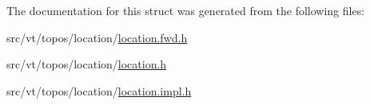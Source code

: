 The documentation for this struct was generated from the following files\+:\begin{DoxyCompactItemize}
\item 
src/vt/topos/location/\hyperlink{location_8fwd_8h}{location.\+fwd.\+h}\item 
src/vt/topos/location/\hyperlink{location_8h}{location.\+h}\item 
src/vt/topos/location/\hyperlink{location_8impl_8h}{location.\+impl.\+h}\end{DoxyCompactItemize}
